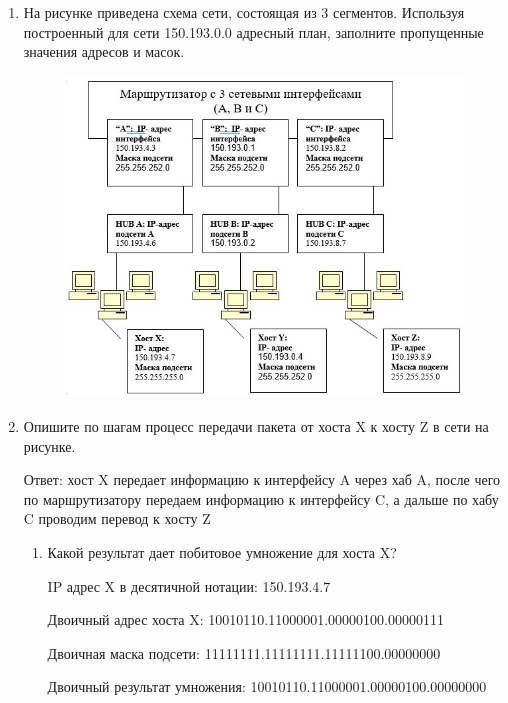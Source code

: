 \documentclass[bachelor, och, labwork]{shiza}
\begin{document}
\begin{enumerate}
    \item На рисунке приведена схема сети, состоящая из 3 сегментов. Используя построенный для сети 150.193.0.0 адресный план, заполните пропущенные значения адресов и масок.
    
    \begin{figure}[H]
        \centering      %
        \includegraphics[width=1\textwidth]{5}
        \label{fig:image1}
    \end{figure}

    \item Опишите по шагам процесс передачи пакета от хоста X к хосту Z в сети на рисунке.
    
    Ответ: хост X передает информацию к интерфейсу A через хаб A, после чего по маршрутизатору передаем информацию к интерфейсу C, а дальше по хабу C 
    проводим перевод к хосту Z

    \begin{enumerate}
        \item Какой результат дает побитовое умножение для хоста X?
        
        IP адрес X в десятичной нотации: 150.193.4.7

        Двоичный адрес хоста X: 10010110.11000001.00000100.00000111

        Двоичная маска подсети: 11111111.11111111.11111100.00000000

        Двоичный результат умножения: 10010110.11000001.00000100.00000000


\end{enumerate}
\end{enumerate}
\end{document}
